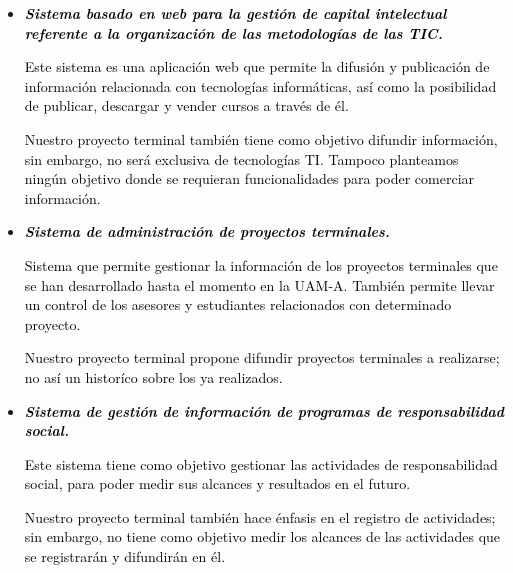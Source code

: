 \documentclass[11pt,letterpaper,titlepage]{article}
\begin{document}
\begin{itemize}

  \item \textcolor{black}{\textit{\textbf{Sistema basado en web para la gesti\'on de capital intelectual referente a la organizaci\'on de las metodolog\'ias de las TIC.}}}

\textcolor{black}{Este sistema es una aplicaci\'on web que permite la difusi\'on y publicaci\'on de informaci\'on relacionada con tecnolog\'ias inform\'aticas, as\'i como la posibilidad de publicar, descargar y vender cursos a trav\'es de \'el.}

\textcolor{black}{Nuestro proyecto terminal tambi\'en tiene como objetivo difundir informaci\'on, sin embargo, no ser\'a exclusiva de tecnolog\'ias TI. Tampoco planteamos ning\'un objetivo donde se requieran funcionalidades para poder comerciar informaci\'on.}

  \item \textcolor{black}{\textit{\textbf{Sistema de administraci\'on de proyectos terminales.}}}

\textcolor{black}{Sistema que permite gestionar la informaci\'on de los proyectos terminales que se han desarrollado hasta el momento en la UAM-A. Tambi\'en permite llevar un control de los asesores y estudiantes relacionados con determinado proyecto.}

\textcolor{black}{Nuestro proyecto terminal propone difundir proyectos terminales a realizarse; no as\'i un histor\'ico sobre los ya realizados.}

  \item \textcolor{black}{\textit{\textbf{Sistema de gesti\'on de informaci\'on de programas de responsabilidad social.}}}

\textcolor{black}{Este sistema tiene como objetivo gestionar las actividades de responsabilidad social, para poder medir sus alcances y resultados en el futuro.}

\textcolor{black}{Nuestro proyecto terminal tambi\'en hace \'enfasis en el registro de actividades; sin embargo, no tiene como objetivo medir los alcances de las actividades que se registrar\'an y difundir\'an en \'el.}

\end{itemize}
\end{document}
